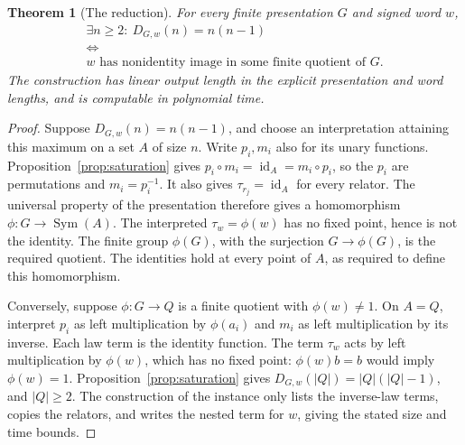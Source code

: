 \documentclass[12pt]{article}
\newtheorem{theorem}{Theorem}[section]
\theoremstyle{definition}
\newcommand{\Sym}{\operatorname{Sym}}
\newcommand{\id}{\operatorname{id}}
\begin{document}
\begin{theorem}[The reduction]\label{thm:reduction}
For every finite presentation $G$ and signed word $w$,
\[
\begin{gathered}
 \exists n\ge2:\ D_{G,w}(n)=n(n-1)\\
 \Longleftrightarrow\\
 \text{$w$ has nonidentity image in some finite quotient of $G$}.
\end{gathered}
\]
The construction has linear output length in the explicit presentation
and word lengths, and is computable in polynomial time.
\end{theorem}
\begin{proof}
Suppose $D_{G,w}(n)=n(n-1)$, and choose an interpretation attaining
this maximum on a set $A$ of size $n$. Write $p_i,m_i$ also for its
unary functions. Proposition~\ref{prop:saturation} gives
$p_i\circ m_i=\id_A=m_i\circ p_i$, so the $p_i$ are permutations and
$m_i=p_i^{-1}$. It also gives $\tau_{r_j}=\id_A$ for every relator.
The universal property of the presentation therefore gives a
homomorphism $\phi:G\to\Sym(A)$. The interpreted $\tau_w=\phi(w)$
has no fixed point, hence is not the identity. The finite group
$\phi(G)$, with the surjection $G\to\phi(G)$, is the required quotient.
The identities hold at every point of $A$, as required to define this
homomorphism.

Conversely, suppose $\phi:G\to Q$ is a finite quotient with
$\phi(w)\ne1$. On $A=Q$, interpret $p_i$ as left multiplication by
$\phi(a_i)$ and $m_i$ as left multiplication by its inverse.
Each law term is the identity function. The term $\tau_w$ acts by
left multiplication by $\phi(w)$, which has no fixed point:
$\phi(w)b=b$ would imply $\phi(w)=1$. Proposition~\ref{prop:saturation}
gives $D_{G,w}(|Q|)=|Q|(|Q|-1)$, and $|Q|\ge2$.
The construction of the instance only lists the inverse-law terms,
copies the relators, and writes the nested term for $w$, giving the
stated size and time bounds.
\end{proof}
\end{document}
